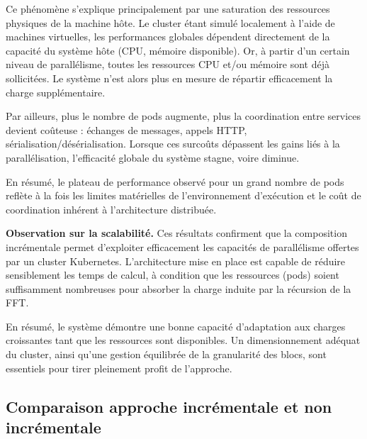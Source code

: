 \begin{itemize}
Ce phénomène s’explique principalement par une saturation des ressources physiques de la machine hôte. Le cluster étant simulé localement à l’aide de machines virtuelles, les performances globales dépendent directement de la capacité du système hôte (CPU, mémoire disponible). Or, à partir d’un certain niveau de parallélisme, toutes les ressources CPU et/ou mémoire sont déjà sollicitées. Le système n’est alors plus en mesure de répartir efficacement la charge supplémentaire.

Par ailleurs, plus le nombre de pods augmente, plus la coordination entre services devient coûteuse : échanges de messages, appels HTTP, sérialisation/désérialisation. Lorsque ces surcoûts dépassent les gains liés à la parallélisation, l’efficacité globale du système stagne, voire diminue.

En résumé, le plateau de performance observé pour un grand nombre de pods reflète à la fois les limites matérielles de l’environnement d’exécution et le coût de coordination inhérent à l’architecture distribuée.
\end{itemize}

\textbf{Observation sur la scalabilité.}
Ces résultats confirment que la composition incrémentale permet d’exploiter efficacement les capacités de parallélisme offertes par un cluster Kubernetes. L’architecture mise en place est capable de réduire sensiblement les temps de calcul, à condition que les ressources (pods) soient suffisamment nombreuses pour absorber la charge induite par la récursion de la FFT.

En résumé, le système démontre une bonne capacité d’adaptation aux charges croissantes tant que les ressources sont disponibles. Un dimensionnement adéquat du cluster, ainsi qu’une gestion équilibrée de la granularité des blocs, sont essentiels pour tirer pleinement profit de l’approche.

\subsection{Comparaison approche incrémentale et non incrémentale}


